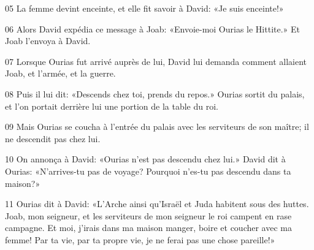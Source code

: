 
05 La femme devint enceinte, et elle fit savoir à David: «Je suis enceinte!»

06 Alors David expédia ce message à Joab: «Envoie-moi Ourias le Hittite.» Et Joab l’envoya à David.

07 Lorsque Ourias fut arrivé auprès de lui, David lui demanda comment allaient Joab, et l’armée, et la guerre.

08 Puis il lui dit: «Descends chez toi, prends du repos.» Ourias sortit du palais, et l’on portait derrière lui une portion de la table du roi.

09 Mais Ourias se coucha à l’entrée du palais avec les serviteurs de son maître; il ne descendit pas chez lui.

10 On annonça à David: «Ourias n’est pas descendu chez lui.» David dit à Ourias: «N’arrives-tu pas de voyage? Pourquoi n’es-tu pas descendu dans ta maison?»

11 Ourias dit à David: «L’Arche ainsi qu’Israël et Juda habitent sous des huttes. Joab, mon seigneur, et les serviteurs de mon seigneur le roi campent en rase campagne. Et moi, j’irais dans ma maison manger, boire et coucher avec ma femme! Par ta vie, par ta propre vie, je ne ferai pas une chose pareille!»
